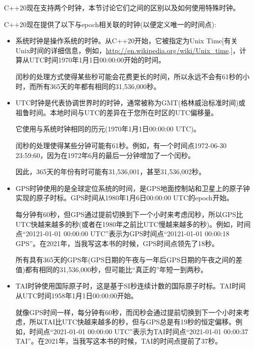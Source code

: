 
C++20现在支持两个时钟，本节讨论它们之间的区别以及如何使用特殊时钟。


C++20现在提供了以下与epoch相关联的时钟(以便定义唯一的时间点):

\begin{itemize}
\item 
系统时钟是操作系统的时钟。从C++20开始，它被指定为Unix Time[有关Unix时间的详细信息，例如，\url{http://en.wikipedia.org/wiki/Unix_time}.]，计算从UTC时间1970年1月1日00:00:00开始的时间。

闰秒的处理方式使得某些秒可能会花费更长的时间，所以永远不会有61秒的小时，而所有365天的年都有相同的31,536,000秒。

\item
UTC时钟是代表协调世界时的时钟，通常被称为GMT(格林威治标准时间)或祖鲁时间。本地时间与UTC的差异在于您所在时区的UTC偏移量。

它使用与系统时钟相同的历元(1970年1月1日00:00:00 UTC)。

闰秒的处理使得某些分钟可能有61秒。例如，有一个时间点1972-06-30 23:59:60，因为在1972年6月的最后一分钟增加了一个闰秒。

因此，365天的年份有时可能有31,536,001，甚至31,536,002秒。

\item
GPS时钟使用的是全球定位系统的时间，是GPS地面控制站和卫星上的原子钟实现的原子时标。GPS时间从1980年1月6日00:00:00 UTC的epoch开始。

每分钟有60秒，但GPS通过提前切换到下一个小时来考虑闰秒，所以GPS比UTC快越来越多的秒(或者在1980年之前比UTC慢越来越多的秒)。例如，时间点“20121-01-01 00:00:00 UTC”表示为GPS时间点“20121-01-01 00:00:18 GPS”。在2021年，当我写这本书的时候，GPS时间点领先了18秒。

所有具有365天的GPS年(GPS日期的午夜与一年后GPS日期的午夜之间的差值)都有相同的31,536,000秒，但可能比“真正的”年短一到两秒。

\item
TAI时钟使用国际原子时，这是基于SI秒连续计数的国际原子时标。TAI时间从UTC时间1958年1月1日00:00:00开始。

就像GPS时间一样，每分钟有60秒，而闰秒会通过提前切换到下一个小时来考虑，所以TAI比UTC快越来越多的秒，但与GPS总是有19秒的恒定偏移。例如，时间点“2021-01-01 00:00:00 UTC”表示为TAI时间点“2021-01-01 00:00:37 TAI”。在2021年，当我写这本书的时候，TAI的时间点提前了37秒。
\end{itemize}



